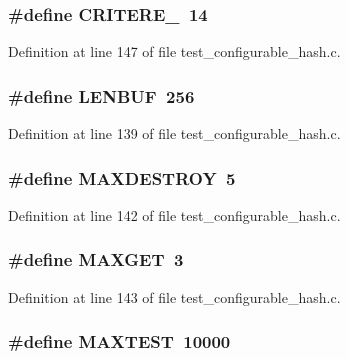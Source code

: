 \subsubsection[{CRITERE\_\-2}]{\setlength{\rightskip}{0pt plus 5cm}\#define CRITERE\_~14}\label{test__configurable__hash_8c_d449333f1ec8fe49765893cc1980d94d}




Definition at line 147 of file test\_\-configurable\_\-hash.c.
\subsubsection[{LENBUF}]{\setlength{\rightskip}{0pt plus 5cm}\#define LENBUF~256}\label{test__configurable__hash_8c_799f2d62ff1a8069195e037a3b7905ae}




Definition at line 139 of file test\_\-configurable\_\-hash.c.
\subsubsection[{MAXDESTROY}]{\setlength{\rightskip}{0pt plus 5cm}\#define MAXDESTROY~5}\label{test__configurable__hash_8c_428c97a2aa1643805f8b16275c702607}




Definition at line 142 of file test\_\-configurable\_\-hash.c.
\subsubsection[{MAXGET}]{\setlength{\rightskip}{0pt plus 5cm}\#define MAXGET~3}\label{test__configurable__hash_8c_7d82597c4bd22fe023995390a5a90f95}




Definition at line 143 of file test\_\-configurable\_\-hash.c.
\subsubsection[{MAXTEST}]{\setlength{\rightskip}{0pt plus 5cm}\#define MAXTEST~10000}\label{test__configurable__hash_8c_03d9dd35a7b43ebc597de16d46a0e845}




